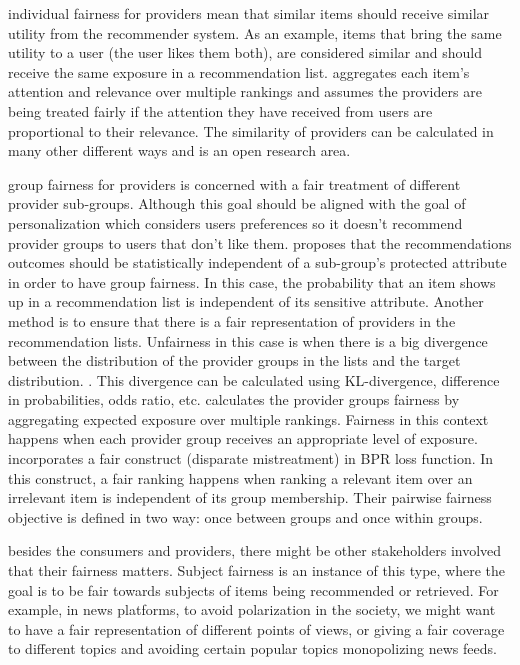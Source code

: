     individual fairness for providers mean that similar items should receive similar utility from the recommender system. As an example, items that bring the same utility to a user (the user likes them both), are considered similar and should receive the same exposure in a recommendation list. \cite{biega2018equity} aggregates each item's attention and relevance over multiple rankings and assumes the providers are being treated fairly if the attention they have received from users are proportional to their relevance. The similarity of providers can be calculated in many other different ways and is an open research area.
    
    group fairness for providers is concerned with a fair treatment of different provider sub-groups. Although this goal should be aligned with the goal of personalization which considers users preferences so it doesn't recommend provider groups to users that don't like them. \cite{kamishima2018recommendation} proposes that the recommendations outcomes should be statistically independent of a sub-group's protected attribute in order to have group fairness. In this case, the probability that an item shows up in a recommendation list is independent of its sensitive attribute.
    Another method is to ensure that there is a fair representation of providers in the recommendation lists. Unfairness in this case is when there is a big divergence between the distribution of the provider groups in the lists and the target distribution. \cite{yang2017measuring,das2019conceptual}. This divergence can be calculated using KL-divergence, difference in probabilities, odds ratio, etc. \cite{biega2018equity} calculates the provider groups fairness by aggregating expected exposure over multiple rankings. Fairness in this context happens when each provider group receives an appropriate level of exposure. \cite{beutel2019fairness} incorporates a fair construct (disparate mistreatment) in BPR\cite{rendlebpr2009} loss function. In this construct, a fair ranking happens when ranking a relevant item over an irrelevant item is independent of its group membership. Their pairwise fairness objective is defined in two way: once between groups and once within groups.
    
    besides the consumers and providers, there might be other stakeholders involved that their fairness matters. Subject fairness is an instance of this type, where the goal is to be fair towards subjects of items being recommended or retrieved. For example, in news platforms, to avoid polarization in the society, we might want to have a fair representation of different points of views, or giving a fair coverage to different topics and avoiding certain popular topics monopolizing news feeds.
    
